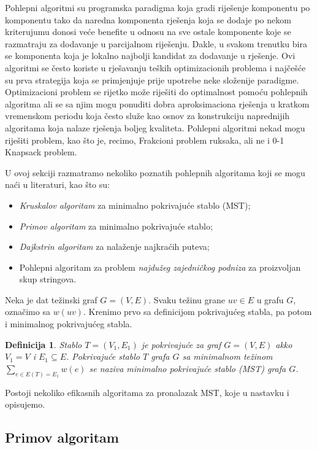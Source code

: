 \documentclass[a4paper, utf8, 11pt, colorlinks]{book}
\newtheorem{definition}{Definicija}
\begin{document}
Pohlepni algoritmi su programska paradigma koja gradi riješenje komponentu po komponentu tako da  naredna komponenta rješenja koja se dodaje po nekom kriterujumu donosi veće benefite u odnosu na sve ostale komponente koje se razmatraju za dodavanje u parcijalnom riješenju. Dakle, u svakom trenutku bira se komponenta koja je lokalno najbolji kandidat za dodavanje u rješenje.  Ovi algoritmi se često koriste u rješavanju teških optimizacionih problema i najčešće su prva strategija koja se primjenjuje prije 
upotrebe neke složenije paradigme. Optimizacioni problem se rijetko može riješiti do optimalnost pomoću pohlepnih algoritma ali se sa njim mogu ponuditi dobra aproksimaciona rješenja u kratkom vremenskom periodu koja često služe kao osnov za konstrukciju naprednijih algoritama koja nalaze  rješenja boljeg kvaliteta. Pohlepni algoritmi nekad mogu riješiti problem, kao što je, recimo, Frakcioni problem ruksaka, ali ne i 0-1 Knapsack problem. 

U ovoj sekciji razmatramo nekoliko poznatih pohlepnih algoritama koji se mogu naći u literaturi, kao što su:
\begin{itemize}
	\item  \emph{Kruskalov algoritam} za minimalno pokrivajuće stablo (MST);
	\item  \emph{Primov algoritam} za minimalno pokrivajuće stablo;
	\item  \emph{Dajkstrin algoritam} za nalaženje najkraćih puteva;
	\item  Pohlepni algoritam za problem \emph{najdužeg zajedničkog podniza} za proizvoljan skup stringova.
\end{itemize}

Neka je dat težinski graf $G=(V,E)$. Svaku težinu grane $uv \in E $ u grafu $G$, označimo sa $w(uv)$. 
Krenimo prvo sa definicijom pokrivajućeg stabla, pa potom i minimalnog pokrivajućeg stabla. 
\begin{definition}
  Stablo $T =(V_1, E_1)$ je pokrivajuće za graf $G=(V,E)$ akko
  $V_1 = V$ i $E_1 \subseteq E$. Pokrivajuće stablo $T$ grafa $G$ sa minimalnom težinom 
  $\sum_{e \in E(T)=E_1} w(e)$ se naziva minimalno pokrivajuće stablo (MST) grafa $G$. 
\end{definition}
Postoji nekoliko efikasnih algoritama za pronalazak MST, koje u nastavku i opisujemo. 


\subsection{Primov algoritam}
\end{document}
